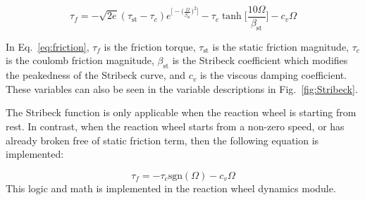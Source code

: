 \begin{equation}
\tau_{f} = - \sqrt{2 e} (\tau_{\text{st}}-\tau_c) e^{\Big[-\big(\frac{\Omega}{\beta_{\text{st}}}\big)^2\Big]} - \tau_c \tanh \Big[\frac{10 \Omega}{\beta_{\text{st}}}\Big] - c_v \Omega
\label{eq:friction}
\end{equation}

In Eq.~\eqref{eq:friction}, $\tau_{f}$ is the friction torque, $\tau_{\text{st}}$ is the static friction magnitude, $\tau_c$ is the coulomb friction magnitude, $\beta_{\text{st}}$ is the Stribeck coefficient which modifies the peakedness of the Stribeck curve, and $c_v$ is the viscous damping coefficient. These variables can also be seen in the variable descriptions in Fig.~\ref{fig:Stribeck}. 

The Stribeck function is only applicable when the reaction wheel is starting from rest. In contrast, when the reaction wheel starts from a non-zero speed, or has already broken free of static friction term, then the following equation is implemented:

\begin{equation}
\tau_{f} = - \tau_c \text{sgn} (\Omega) - c_v \Omega
\label{eq:friction2}
\end{equation}
This logic and math is implemented in the reaction wheel dynamics module. 
